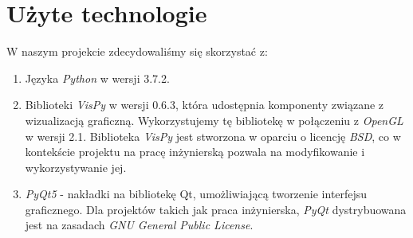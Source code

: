 \documentclass{article}
\let\oldsection\section
\renewcommand\section{\clearpage\oldsection}
\newcommand{\modulename}[1]{\textit{#1}}
\begin{document}
\section{Użyte technologie}
W naszym projekcie zdecydowaliśmy się skorzystać z:
\begin{enumerate}
	\item Języka \modulename{Python} w wersji 3.7.2.
	\item Biblioteki \modulename{VisPy} w wersji 0.6.3, która udostępnia komponenty związane z wizualizacją graficzną. Wykorzystujemy tę bibliotekę w połączeniu z \modulename{OpenGL} w wersji 2.1. Biblioteka \modulename{VisPy} jest stworzona w oparciu o licencję \modulename{BSD}, co w kontekście projektu na pracę inżynierską pozwala na modyfikowanie i wykorzystywanie jej.
	\item \modulename{PyQt5} - nakładki na bibliotekę Qt, umożliwiającą tworzenie interfejsu graficznego. Dla projektów takich jak praca inżynierska, \modulename{PyQt} dystrybuowana jest na zasadach \modulename{GNU General Public License}.
\end{enumerate}
\end{document}
